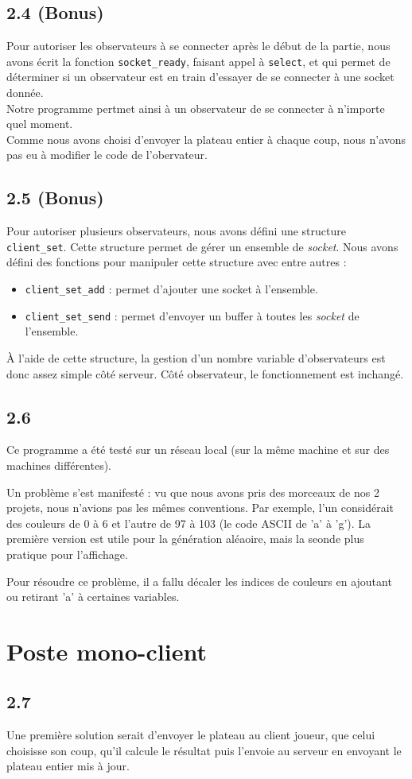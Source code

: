 \documentclass[12pt]{article}
\def\question#1{\subsection{#1}}
\def\sec#1{\section{#1}}
\begin{document}
  

\question{2.4 (Bonus)}
Pour autoriser les observateurs à se connecter après le début de la partie, nous avons écrit la fonction \texttt{socket\_ready}, faisant appel à \texttt{select}, et qui permet de déterminer si un observateur est en train d'essayer de se connecter à une socket donnée. \\
Notre programme pertmet ainsi à un observateur de se connecter à n'importe quel moment. \\
Comme nous avons choisi d'envoyer la plateau entier à chaque coup, nous n'avons pas eu à modifier le code de l'obervateur.



\question{2.5 (Bonus)}
Pour autoriser plusieurs observateurs, nous avons défini une structure \texttt{client\_set}. Cette structure permet de gérer un ensemble de \textit{socket}. Nous avons défini des fonctions pour manipuler cette structure avec entre autres :
\begin{itemize}
\item \texttt{client\_set\_add} : permet d'ajouter une socket à l'ensemble.
\item \texttt{client\_set\_send} : permet d'envoyer un buffer à toutes les \textit{socket} de l'ensemble.
\end{itemize}
À l'aide de cette structure, la gestion d'un nombre variable d'observateurs est donc assez simple côté serveur. Côté observateur, le fonctionnement est inchangé.



\question{2.6} %

Ce programme a été testé sur un réseau local (sur la même machine et sur des machines différentes).

Un problème s'est manifesté : vu que nous avons pris des morceaux de nos 2 projets, nous n'avions pas les mêmes conventions. Par exemple, l'un considérait des couleurs de 0 à 6 et l'autre de 97 à 103 (le code ASCII de 'a' à 'g'). La première version est utile pour la génération aléaoire, mais la seonde plus pratique pour l'affichage.

Pour résoudre ce problème, il a fallu décaler les indices de couleurs en ajoutant ou retirant 'a' à certaines variables.


\sec{Poste mono-client}
\question{2.7}
Une première solution serait d'envoyer le plateau au client joueur, que celui choisisse son coup, qu'il calcule le résultat puis l'envoie au serveur en envoyant le plateau entier mis à jour.
\end{document}
